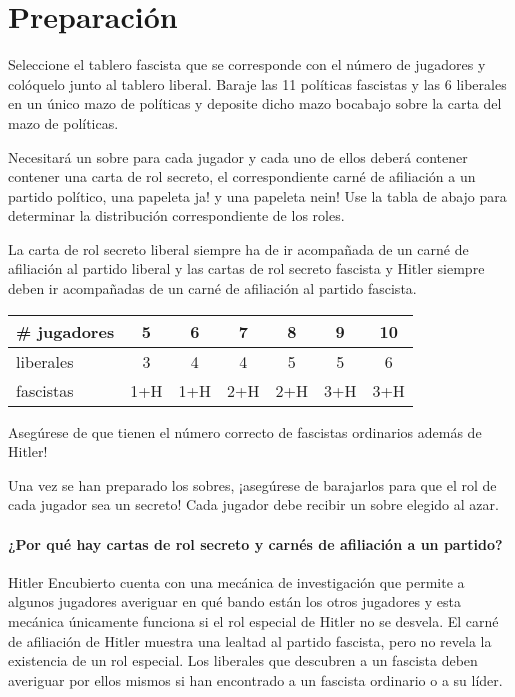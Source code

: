 \documentclass[13pt,a4paper,twocolumn,titlepage]{scrartcl}
\begin{document}
	\section*{Preparación}
	Seleccione el tablero \textcolor{fascist}{fascista} que se corresponde con el número de jugadores y colóquelo junto al tablero \textcolor{liberal}{liberal}. Baraje las 11 políticas \textcolor{fascist}{fascistas} y las 6 \textcolor{liberal}{liberales} en un único mazo de políticas y deposite dicho mazo bocabajo sobre la carta del mazo de políticas.
	
	Necesitará un sobre para cada jugador y cada uno de ellos deberá contener contener una carta de rol secreto, el correspondiente carné de afiliación a un partido político, una papeleta ja! y una papeleta nein! Use la tabla de abajo para determinar la distribución correspondiente de los roles.
	
	La carta de rol secreto \textcolor{liberal}{liberal} siempre ha de ir acompañada de un carné de afiliación al partido \textcolor{liberal}{liberal} y las cartas de rol secreto \textcolor{fascist}{fascista} y \textcolor{fascist}{Hitler} siempre deben ir acompañadas de un carné de afiliación al partido \textcolor{fascist}{fascista}.	
	\begin{center}
		\begin{tabular}{l|c|c|c|c|c|c}
			\# jugadores & 5 & 6 & 7 & 8 & 9 & 10\\
			\hline
			\textcolor{liberal}{liberales} & 3 & 4 & 4 & 5 & 5 & 6\\
			\hline
			\textcolor{fascist}{fascistas} & 1+H & 1+H & 2+H & 2+H & 3+H & 3+H\\	
		\end{tabular}
	\end{center}
	
	Asegúrese de que tienen el número correcto de \textcolor{fascist}{fascistas} ordinarios además de \textcolor{fascist}{Hitler}!
	
	Una vez se han preparado los sobres, ¡asegúrese de barajarlos para que el rol de cada jugador sea un secreto! Cada jugador debe recibir un sobre elegido al azar.
	
	\vspace*{-8mm}
	\paragraph{\textcolor{SeaGreen4}{¿Por qué hay cartas de rol secreto y carnés de afiliación a un partido?}}
	\textcolor{SeaGreen4}{Hitler Encubierto cuenta con una mecánica de investigación que permite a algunos jugadores averiguar en qué bando están los otros jugadores y esta mecánica únicamente funciona si el rol especial de Hitler no se desvela. El carné de afiliación de Hitler muestra una lealtad al partido fascista, pero no revela la existencia de un rol especial. Los liberales que descubren a un fascista deben averiguar por ellos mismos si han encontrado a un fascista ordinario o a su líder.}
	
\end{document}
